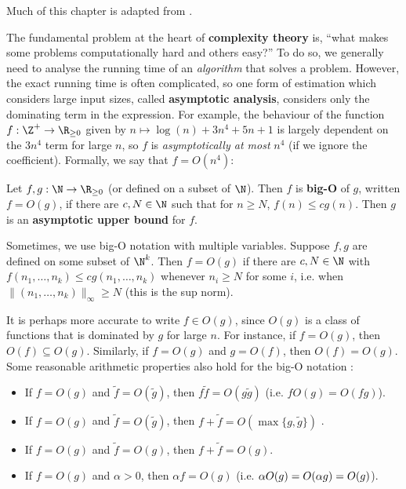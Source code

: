 Much of this chapter is adapted from \cite{sipser_intro_theory_comp2013}.

The fundamental problem at the heart of \textbf{complexity theory} is, ``what makes some problems computationally hard and others easy?'' To do so, we generally need to analyse the running time of an \textit{algorithm} that solves a problem. However, the exact running time is often complicated, so one form of estimation which considers large input sizes, called \textbf{asymptotic analysis}, considers only the dominating term in the expression. For example, the behaviour of the function $f : \Z^+ \to \R_{\geq 0}$ given by $n \mapsto \log(n) + 3n^4 + 5n + 1$ is largely dependent on the $3n^4$ term for large $n$, so $f$ is \textit{asymptotically at most} $n^4$ (if we ignore the coefficient). Formally, we say that $f = O(n^4)$:

\begin{definition}\label{def:big_O_notation}
    Let $f,g : \N \to \R_{\geq 0}$ (or defined on a subset of $\N$). Then $f$ is \textbf{big-O} of $g$, written $f = O(g)$, if there are $c,N \in \N$ such that for $n \geq N$, $f(n) \leq cg(n)$. Then $g$ is an \textbf{asymptotic upper bound} for $f$. %
\end{definition}

Sometimes, we use big-O notation with multiple variables. Suppose $f,g$ are defined on some subset of $\N^k$. Then $f = O(g)$ if there are $c,N \in \N$ with $f(n_1,\dotsc,n_k) \leq cg(n_1,\dotsc,n_k)$ whenever $n_i \geq N$ for some $i$, i.e. when $\|(n_1,\dotsc,n_k)\|_\infty \geq N$ (this is the sup norm).

It is perhaps more accurate to write $f \in O(g)$, since $O(g)$ is a class of functions that is dominated by $g$ for large $n$. For instance, if $f = O(g)$, then $O(f) \subseteq O(g)$. Similarly, if $f = O(g)$ and $g = O(f)$, then $O(f) = O(g)$. Some reasonable arithmetic properties also hold for the big-O notation :

\begin{itemize}
    \item If $f = O(g)$ and $\tilde f = O(\tilde g)$, then $f\tilde f = O(g\tilde g)$ (i.e. $f O(g) = O(fg)$).
    \item If $f = O(g)$ and $\tilde f = O(\tilde g)$, then $f + \tilde f = O(\max\{g,\tilde g\})$ .
    \item If $f = O(g)$ and $\tilde f = O(g)$, then $f + \tilde f = O(g)$.
    \item If $f = O(g)$ and $\alpha > 0$, then $\alpha f = O(g)$ (i.e. $\alpha O(g) = \added{1}{O(\alpha g)} = O(g)$).
\end{itemize}

